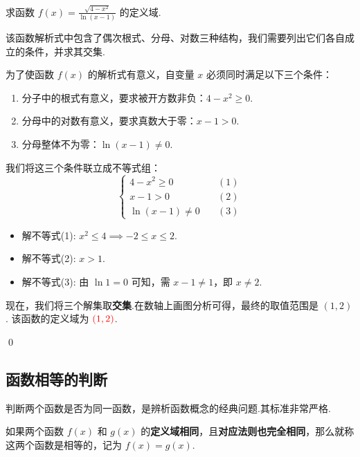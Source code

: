 \begin{exercise}
	求函数 $f(x) = \frac{\sqrt{4-x^2}}{\ln(x-1)}$ 的定义域.
\end{exercise}
\begin{solution}

	\textcolor{green!50!black}{该函数解析式中包含了偶次根式、分母、对数三种结构，我们需要列出它们各自成立的条件，并求其交集.}

	为了使函数 $f(x)$ 的解析式有意义，自变量 $x$ 必须同时满足以下三个条件：
	\begin{enumerate}
		\item 分子中的根式有意义，要求被开方数非负：$4-x^2 \ge 0$.
		\item 分母中的对数有意义，要求真数大于零：$x-1 > 0$.
		\item 分母整体不为零：$\ln(x-1) \neq 0$.
	\end{enumerate}
	
	我们将这三个条件联立成不等式组：
	\begin{equation*}
		\begin{cases}
			4-x^2 \ge 0 & \quad (1) \\
			x-1 > 0 & \quad (2) \\
			\ln(x-1) \neq 0 & \quad (3)
		\end{cases}
	\end{equation*}
	
	\begin{itemize}
		\item 解不等式(1): $x^2 \le 4 \implies -2 \le x \le 2$.
		\item 解不等式(2): $x > 1$.
		\item 解不等式(3): 由 $\ln 1 = 0$ 可知，需 $x-1 \neq 1$，即 $x \neq 2$.
	\end{itemize}
	
	现在，我们将三个解集取\textbf{交集}.在数轴上画图分析可得，最终的取值范围是 $(1, 2)$.
	该函数的定义域为 $\textcolor{red}{(1, 2)}$.
\end{solution}
\qed

\subsection{函数相等的判断}

判断两个函数是否为同一函数，是辨析函数概念的经典问题.其标准非常严格.

\begin{definition}[函数相等]
	如果两个函数 $f(x)$ 和 $g(x)$ 的\textbf{定义域相同}，且\textbf{对应法则也完全相同}，那么就称这两个函数是相等的，记为 $f(x)=g(x)$.
\end{definition}


